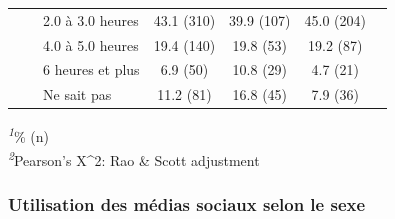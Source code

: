 \documentclass[
]{article}
\begin{document}
\begin{table}[!t]
\begin{tabular*}{\linewidth}{@{\extracolsep{\fill}}lcccc}
    2.0 à 3.0 heures & 43.1 (310) & 39.9 (107) & 45.0 (204) &  \\ 
    4.0 à 5.0 heures & 19.4 (140) & 19.8 (53) & 19.2 (87) &  \\ 
    6 heures et plus & 6.9 (50) & 10.8 (29) & 4.7 (21) &  \\ 
    Ne sait pas & 11.2 (81) & 16.8 (45) & 7.9 (36) &  \\ 
\bottomrule
\end{tabular*}
\begin{minipage}{\linewidth}
\textsuperscript{\textit{1}}\% (n)\\
\textsuperscript{\textit{2}}Pearson's X\^{}2: Rao \& Scott adjustment\\
\end{minipage}
\end{table}
\vspace{1cm}

\hypertarget{utilisation-des-muxe9dias-sociaux-selon-le-sexe}{%
\subsubsection{Utilisation des médias sociaux selon le
sexe}\label{utilisation-des-muxe9dias-sociaux-selon-le-sexe}}
\end{document}
